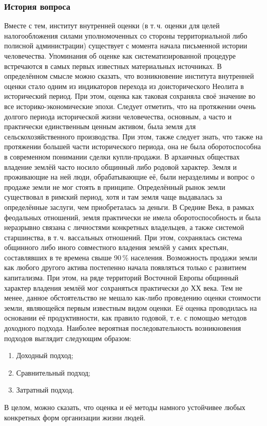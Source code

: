 \documentclass[12pt]{scrartcl}
\begin{document}
\subsubsection{История вопроса}
Вместе с тем, институт внутренней оценки (в т.\,ч. оценки для целей налогообложения силами уполномоченных со стороны территориальной либо полисной администрации) существует с момента начала письменной истории человечества. Упоминания об оценке как систематизированной процедуре встречаются в самых первых известных материальных источниках. В определённом смысле можно сказать, что возникновение института внутренней оценки стало одним из индикаторов перехода из доисторического Неолита в исторический период. При этом, оценка как таковая сохраняла своё значение во все историко-экономические эпохи. Следует отметить, что на протяжении очень долгого периода исторической жизни человечества, основным, а часто и практически единственным ценным активом, была земля для сельскохозяйственного производства. При этом, также следует знать, что также на протяжении большей части исторического периода, она не была оборотоспособна в современном понимании сделки купли-продажи. В архаичных обществах владение землёй часто носило общинный либо родовой характер. Земля и проживающие на ней люди, обрабатывающие её, были неразделимы и вопрос о продаже земли не мог стоять в принципе. Определённый рынок земли существовал в римский период, хотя и там земля чаще выдавалась за определённые заслуги, чем приобреталась за деньги. В Средние Века, в рамках феодальных отношений, земля практически не имела оборотоспособность и была неразрывно связана с личностями конкретных владельцев, а также системой старшинства, в т.\,ч. вассальных отношений. При этом, сохранялась система общинного либо иного совместного владения землёй у самих крестьян, составлявших в те времена свыше 90\,\% населения. Возможность продажи земли как любого другого актива постепенно начала появляться только с развитием капитализма. При этом, на ряде территорий Восточной Европы общинный характер владения землёй мог сохраняться практически до ХХ века. Тем не менее, данное обстоятельство не мешало как-либо проведению оценки стоимости земли, являющейся первым известным видом оценки. Её оценка проводилась на основании её продуктивности, как правило годовой, т.\,е. с помощью методов доходного подхода. Наиболее вероятная последовательность возникновения подходов выглядит следующим образом:
\begin{enumerate}
    \item Доходный подход;
    \item Сравнительный подход;
    \item Затратный подход.
\end{enumerate}
В целом, можно сказать, что оценка и её методы намного устойчивее любых конкретных форм организации жизни людей.
\end{document}
